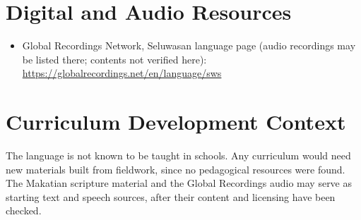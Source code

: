 \documentclass[12pt]{article}
\begin{document}
\section{Digital and Audio Resources}
\begin{itemize}
\item Global Recordings Network, Seluwasan language page (audio recordings may be listed there; contents not verified here): \url{https://globalrecordings.net/en/language/sws}
\end{itemize}

\section{Curriculum Development Context}
The language is not known to be taught in schools. Any curriculum would need new materials built from fieldwork, since no pedagogical resources were found. The Makatian scripture material and the Global Recordings audio may serve as starting text and speech sources, after their content and licensing have been checked.
\end{document}
